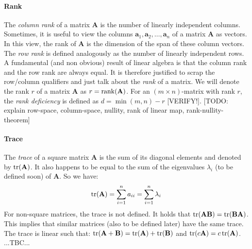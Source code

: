 \paragraph{Rank}
The \emph{column rank} of a matrix $\mathbf{A}$ is the number of linearly independent columns. Sometimes, it is useful to view the columns $\mathbf{a}_1, \mathbf{a}_2, \ldots, \mathbf{a}_n$ of a matrix $\mathbf{A}$ as vectors. In this view, the rank of $\mathbf{A}$ is the dimension of the span of these column vectors. The \emph{row rank} is defined analogously as the number of linearly independent rows. A fundamental (and non obvious) result of linear algebra is that the column rank and the row rank are always equal. It is therefore justified to scrap the row/column qualifiers and just talk about the \emph{rank} of a matrix. We will denote the rank $r$ of a matrix $\mathbf{A}$ as $r = \operatorname{rank}(\mathbf{A})$. For an $(m \times n)$-matrix with rank $r$, the \emph{rank deficiency} is defined as $d = \min(m,n) - r$ [VERIFY!]. [TODO: explain row-space, column-space, nullity, rank of linear map, rank-nullity-theorem]


\paragraph{Trace}
The \emph{trace} of a square matrix $\mathbf{A}$ is the sum of its diagonal elements and denoted by $\operatorname{tr}(\mathbf{A})$. It also happens to be equal to the sum of the eigenvalues $\lambda_i$ (to be defined soon) of $\mathbf{A}$. So we have:
\begin{equation}
 \operatorname{tr}(\mathbf{A}) = \sum_{i=1}^{n} a_{ii} = \sum_{i = 1}^{n} \lambda_i
\end{equation}
For non-square matrices, the trace is not defined. It holds that $\operatorname{tr}(\mathbf{A B}) = \operatorname{tr}(\mathbf{B A})$. This implies that similar matrices (also to be defined later) have the same trace. The trace is linear such that: $\operatorname{tr}(\mathbf{A + B}) = \operatorname{tr}(\mathbf{A}) + \operatorname{tr}(\mathbf{B})$ and $\operatorname{tr}(c \mathbf{A}) = c \operatorname{tr}(\mathbf{A})$. ...TBC...


